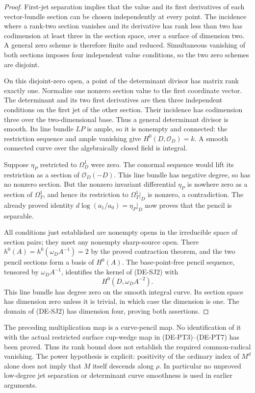 \begin{proof}
First-jet separation implies that the value and its first
derivatives of each vector-bundle section can be chosen
independently at every point. The incidence where a rank-two
section vanishes and its derivative has rank less than two has
codimension at least three in the section space, over a surface
of dimension two. A general zero scheme is therefore finite and
reduced. Simultaneous vanishing of both sections imposes four
independent value conditions, so the two zero schemes are disjoint.

On this disjoint-zero open, a point of the determinant divisor has
matrix rank exactly one. Normalize one nonzero section value to
the first coordinate vector. The determinant and its two first
derivatives are then three independent conditions on the first
jet of the other section. Their incidence has codimension three
over the two-dimensional base. Thus a general determinant divisor
is smooth. Its line bundle $LP$ is ample, so it is nonempty and
connected: the restriction sequence and ample vanishing give
$H^0(D,\mathcal O_D)=k$. A smooth connected curve over the
algebraically closed field is integral.

Suppose $\eta_P$ restricted to $\Omega_D^1$ were zero. The conormal
sequence would lift its restriction as a section of
$\mathcal O_D(-D)$. This line bundle has negative degree, so has
no nonzero section. But the nonzero invariant differential
$\eta_P$ is nowhere zero as a section of $\Omega_T^1$, and hence
its restriction to $\Omega_T^1|_D$ is nonzero, a contradiction.
The already proved identity
$d\log(a_1/a_0)=\eta_P|_D$ now proves that the pencil is separable.

All conditions just established are nonempty opens in the
irreducible space of section pairs; they meet any nonempty
sharp-source open. There $h^0(A)=h^0(\omega_D A^{-1})=2$ by the
proved contraction theorem, and the two pencil sections form a
basis of $H^0(A)$. The base-point-free pencil sequence, tensored
by $\omega_D A^{-1}$, identifies the kernel of (DE-SJ2) with
\[
                          H^0(D,\omega_D A^{-2}).
\]
This line bundle has degree zero on the smooth integral curve.
Its section space has dimension zero unless it is trivial, in
which case the dimension is one. The domain of (DE-SJ2) has
dimension four, proving both assertions.
\end{proof}

\begin{remark}
\label{rem:DE-A3-positive-smooth-pencil-scope}
The preceding multiplication map is a curve-pencil map. No
identification of it with the actual restricted surface cup-wedge
map in (DE-PT3)--(DE-PT7) has been proved. Thus its rank bound does
not establish the required common-radical vanishing. The power
hypothesis is explicit: positivity of the ordinary index of
$M^d$ alone does not imply that $M$ itself descends along $\rho$.
In particular no unproved low-degree jet separation or determinant
curve smoothness is used in earlier arguments.
\end{remark}

